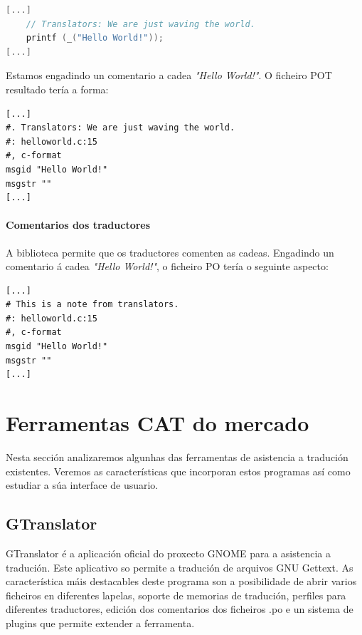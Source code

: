 \begin{lstlisting}[language=C,caption=Tradución con comentario.]
[...]
    // Translators: We are just waving the world.
    printf (_("Hello World!"));
[...]
\end{lstlisting}

Estamos engadindo un comentario a cadea \emph{"Hello World!"}. O ficheiro POT resultado tería a forma:

\begin{lstlisting}[label=some-code,caption=Ficheiro POT con comentario.]
[...]
#. Translators: We are just waving the world.
#: helloworld.c:15
#, c-format
msgid "Hello World!"
msgstr ""
[...]
\end{lstlisting}


\paragraph{Comentarios dos traductores}
A biblioteca permite que os traductores comenten as cadeas. Engadindo un comentario á cadea \emph{"Hello World!"}, o ficheiro PO tería o seguinte aspecto:

\begin{lstlisting}[caption=Ficheiro PO con comentario.]
[...]
# This is a note from translators.
#: helloworld.c:15
#, c-format
msgid "Hello World!"
msgstr ""
[...]
\end{lstlisting}

\section{Ferramentas CAT do mercado}

Nesta sección analizaremos algunhas das ferramentas de asistencia a tradución existentes. Veremos as características que incorporan estos programas así como estudiar a súa interface de usuario.

\subsection{GTranslator}
GTranslator é a aplicación oficial do proxecto GNOME para a asistencia a tradución. Este aplicativo so permite a tradución de arquivos GNU Gettext. As característica máis destacables deste programa son a posibilidade de abrir varios ficheiros en diferentes lapelas, soporte de memorias de tradución, perfiles para diferentes traductores, edición dos comentarios dos ficheiros .po e un sistema de plugins que permite extender a ferramenta.

